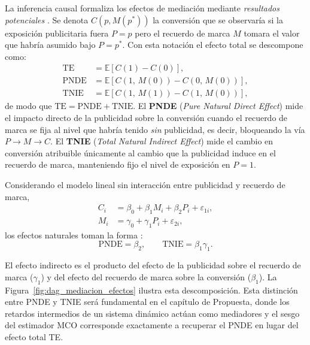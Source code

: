 \documentclass[12pt]{report} %
\begin{document}
La inferencia causal formaliza los efectos de mediación mediante \emph{resultados potenciales} \cite{Muthn2014}. Se denota $C(p, M(p^{*}))$ la conversión que se observaría si la exposición publicitaria fuera $P = p$ pero el recuerdo de marca $M$ tomara el valor que habría asumido bajo $P = p^{*}$. Con esta notación el efecto total se descompone como:
\begin{align}
    \mathrm{TE}   & = \mathbb{E}[C(1) - C(0)], \label{eq:te_cf}              \\
    \mathrm{PNDE} & = \mathbb{E}[C(1,\,M(0)) - C(0,\,M(0))], \label{eq:pnde} \\
    \mathrm{TNIE} & = \mathbb{E}[C(1,\,M(1)) - C(1,\,M(0))], \label{eq:tnie}
\end{align}
de modo que $\mathrm{TE} = \mathrm{PNDE} + \mathrm{TNIE}$. El \textbf{PNDE} (\textit{Pure Natural Direct Effect}) mide el impacto directo de la publicidad sobre la conversión cuando el recuerdo de marca se fija al nivel que habría tenido \emph{sin} publicidad, es decir, bloqueando la vía $P \to M \to C$. El \textbf{TNIE} (\textit{Total Natural Indirect Effect}) mide el cambio en conversión atribuible únicamente al cambio que la publicidad induce en el recuerdo de marca, manteniendo fijo el nivel de exposición en $P = 1$.

Considerando el modelo lineal sin interacción entre publicidad y recuerdo de marca,
\begin{align*}
    C_i & = \beta_0 + \beta_1 M_i + \beta_2 P_i + \varepsilon_{1i}, \\
    M_i & = \gamma_0 + \gamma_1 P_i + \varepsilon_{2i},
\end{align*}
los efectos naturales toman la forma \cite{Muthn2014}:
\begin{equation}
    \mathrm{PNDE} = \beta_2, \qquad
    \mathrm{TNIE} = \beta_1\gamma_1. \label{eq:pnde_tnie_lin}
\end{equation}

El efecto indirecto es el producto del efecto de la publicidad sobre el recuerdo de marca ($\gamma_1$) y del efecto del recuerdo de marca sobre la conversión ($\beta_1$). La Figura~\ref{fig:dag_mediacion_efectos} ilustra esta descomposición. Esta distinción entre PNDE y TNIE será fundamental en el capítulo de Propuesta, donde los retardos intermedios de un sistema dinámico actúan como mediadores y el sesgo del estimador MCO corresponde exactamente a recuperar el PNDE en lugar del efecto total TE.
\end{document}

